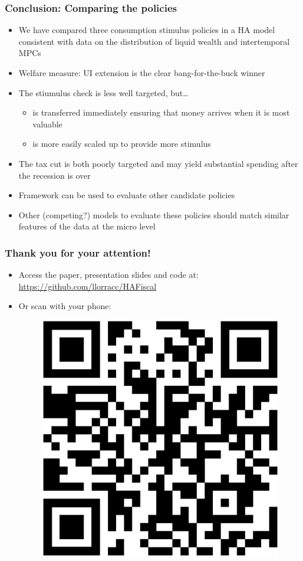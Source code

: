 \documentclass[pdflatex,aspectratio=169]{beamer}
\begin{document}


\begin{frame}
\frametitle{Conclusion: Comparing the policies}
\begin{itemize}
\itemsep = .5\bigskipamount 
\item We have compared three consumption stimulus policies in a HA model consistent with data on the distribution of liquid wealth and intertemporal MPCs 
\item Welfare measure: UI extension is the clear bang-for-the-buck winner 
\item The stiumulus check is less well targeted, but\ldots 
	\begin{itemize}
		\itemsep = .25\bigskipamount 
		\item is transferred immediately ensuring that money arrives when it is most valuable 
		\item is more easily scaled up to provide more stimulus 
	\end{itemize}
\item The tax cut is both poorly targeted and may yield substantial spending after the recession is over 
\item Framework can be used to evaluate other candidate policies 
\item Other (competing?) models to evaluate these policies should match similar features of the data at the micro level 

\end{itemize}

\end{frame}



\begin{frame}
	\frametitle{Thank you for your attention!}
	\begin{itemize}
		\itemsep = .5\bigskipamount 
		\item Access the paper, presentation slides and code at: \newline
		      \url{https://github.com/llorracc/HAFiscal}
		\item Or scan with your phone: \newline
			\begin{figure}
				\centering
				\includegraphics[width=0.3\linewidth]{qr-code}
		 	\end{figure}
		
	\end{itemize}
	
\end{frame}
\end{document}
